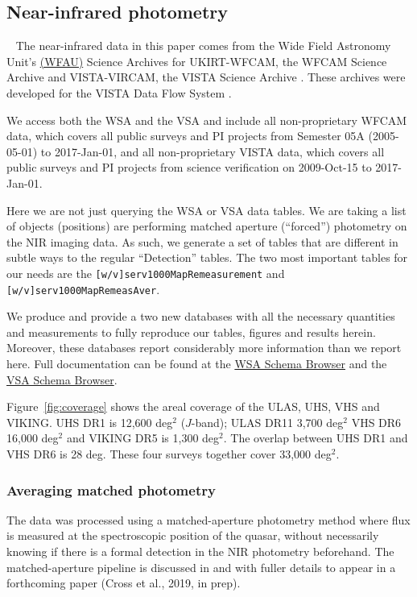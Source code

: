 \documentclass[usenatbib]{mnras}
\begin{document}
\subsection{Near-infrared photometry}~\label{sec:NIR_data} 
The near-infrared data in this paper comes from the Wide Field
Astronomy Unit's \href{https://www.roe.ac.uk/ifa/wfau/}{(WFAU)}
Science Archives for UKIRT-WFCAM, the WFCAM Science Archive
\citep[WSA; ][]{Hambly2008} and VISTA-VIRCAM, the VISTA Science
Archive \citep[VSA; ][]{Cross2012}. These archives were developed for
the VISTA Data Flow System \citep[VDFS][]{VDFS}.

We access both the WSA and the VSA and include all non-proprietary
WFCAM data, which covers all public surveys and PI projects from
Semester 05A (2005-05-01) to 2017-Jan-01, and all non-proprietary VISTA data, which
covers all public surveys and PI projects from science verification on
2009-Oct-15 to 2017-Jan-01.

Here we are not just querying the WSA or VSA data tables. We are
taking a list of objects (positions) are performing matched aperture
(``forced'') photometry on the NIR imaging data. As such, we generate
a set of tables that are different in subtle ways to the regular
``Detection'' tables.  The two most important tables for our needs are
the {\tt [w/v]serv1000MapRemeasurement} and {\tt
[w/v]serv1000MapRemeasAver}.

We produce and provide a two new databases with all the necessary
quantities and measurements to fully reproduce our tables, figures and
results herein. Moreover, these databases report considerably more
information than we report here. Full documentation can be found at
the \href{http://wsa.roe.ac.uk/www/wsa_browser.html}{WSA Schema
Browser} and the
\href{http://horus.roe.ac.uk/vsa/www/vsa_browser.html}{VSA Schema
Browser}.

Figure~\ref{fig:coverage} shows the areal coverage of the ULAS, UHS,
VHS and VIKING. UHS DR1 is 12,600 deg$^{2}$ ($J$-band); ULAS DR11
3,700 deg$^{2}$ VHS DR6 16,000 deg$^{2}$ and VIKING DR5 is 1,300
deg$^{2}$. The overlap between UHS DR1 and VHS DR6 is 28 deg. These
four surveys together cover 33,000 deg$^{2}$.

  \subsubsection{Averaging matched photometry}
  The data was processed using a matched-aperture photometry method
  where flux is measured at the spectroscopic position of the quasar,
  without necessarily knowing if there is a formal detection in the NIR
  photometry beforehand. The matched-aperture pipeline is discussed in
  \citet{Cross2013} and with fuller details to appear in a forthcoming
  paper (Cross et al., 2019, in prep).
  
\end{document}
